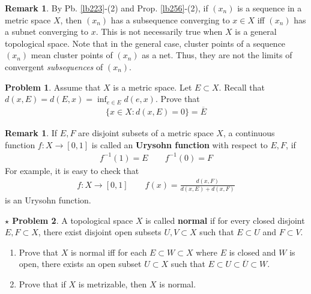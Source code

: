 \documentclass[12pt,b5paper,notitlepage]{article}
\theoremstyle{definition}
\newtheorem{rem}[df]{Remark}
\newtheorem{prob}{\color{red}Problem}[section]
\newtheorem{sprob}[prob]{\color{red}$\star$ Problem}
\theoremstyle{plain}
\newcommand{\ovl}{\overline}
\numberwithin{equation}{section}
\begin{document}
\begin{rem}\label{lb267}
By Pb. \ref{lb223}-(2) and Prop. \ref{lb256}-(2), if $(x_n)$ is a sequence in a metric space $X$, then $(x_n)$ has a subsequence converging to $x\in X$ iff $(x_n)$ has a subnet converging to $x$. This is not necessarily true when $X$ is a general topological space. Note that in the general case, cluster points of a sequence $(x_n)$ mean cluster points of $(x_n)$ as a net. Thus, they are not the limits of convergent \textit{subsequences} of $(x_n)$. 
\end{rem}


\begin{comment}
\begin{rem}
Although the word ``cluster point" is also used for a subset $A$ of $X$ (cf. Rem. \ref{lb176}), it is not parallel to the notion of cluster points of net. The true analogous concept of ``cluster points of a net" is ``closure points of a subset".
\end{rem}
\end{comment}



\begin{prob}\label{lb251}
Assume that $X$ is a metric space. Let $E\subset X$. Recall that $d(x,E)=d(E,x)=\inf_{e\in E}d(e,x)$. Prove that
\begin{align}
\{x\in X:d(x,E)=0\}=\ovl E
\end{align}
\end{prob}





\begin{rem}\label{lb257}
If $E,F$ are disjoint subsets of a metric space $X$, a continuous function $f:X\rightarrow[0,1]$ is called an \textbf{Urysohn function}  with respect to $E,F$, if
\begin{align*}
f^{-1}(1)=E\qquad f^{-1}(0)=F
\end{align*} 
For example, it is easy to check that
\begin{gather}
f:X\rightarrow[0,1]\qquad f(x)=\frac{d(x,F)}{d(x,E)+d(x,F)}
\end{gather}
is an Urysohn function.
\end{rem}


\begin{sprob}
A topological space $X$ is called \textbf{normal}  if for every closed disjoint $E,F\subset X$, there exist disjoint open subsets $U,V\subset X$ such that $E\subset U$ and $F\subset V$. 
\begin{enumerate}
\item Prove that $X$ is normal iff for each $E\subset W\subset X$ where $E$ is closed and $W$ is open, there exists an open subset $U\subset X$ such that $E\subset U\subset \ovl U\subset W$.
\item Prove that if $X$ is metrizable, then $X$ is normal.
\end{enumerate}
\end{sprob}
\end{document}
